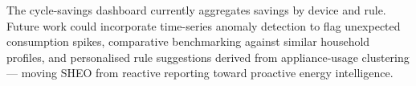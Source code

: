 \begin{description}[style=nextline, leftmargin=1.5em, itemsep=6pt]
  \item[Richer analytics and personalised insights]
        The cycle-savings dashboard currently aggregates savings by device and
        rule.  Future work could incorporate time-series anomaly detection to
        flag unexpected consumption spikes, comparative benchmarking against
        similar household profiles, and personalised rule suggestions derived
        from appliance-usage clustering --- moving SHEO from reactive reporting
        toward proactive energy intelligence.

\end{description}
